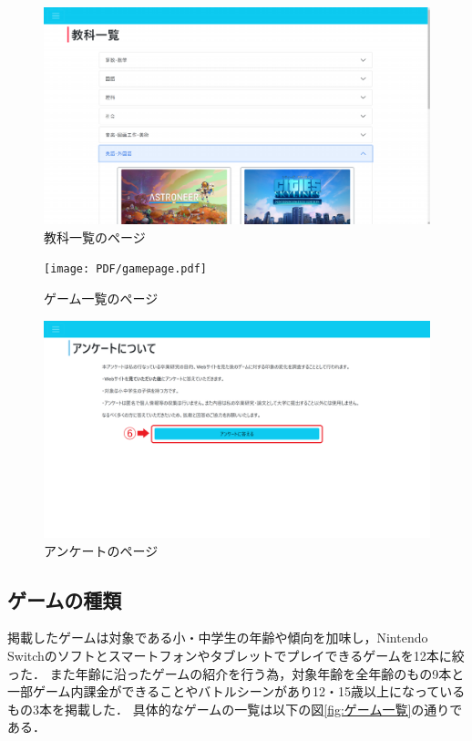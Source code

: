 \documentclass[12pt,a4j,titlepage]{ltjsarticle}
\begin{document}
\begin{figure}[H]
\begin{center}
 \includegraphics[keepaspectratio, scale=0.5]{PDF/subpage.pdf}
\end{center}
 \caption{教科一覧のページ}
 \label{fig:教科ページ}
\end{figure}

\begin{figure}[H]
\begin{center}
 \texttt{[image: PDF/gamepage.pdf]}
\end{center}
 \caption{ゲーム一覧のページ}
 \label{fig:ゲーム一覧ページ}
\end{figure}

\begin{figure}[H]
\begin{center}
 \includegraphics[keepaspectratio, scale=0.15]{PDF/anquepage.pdf}
\end{center}
 \caption{アンケートのページ}
 \label{fig:アンケートページ}
\end{figure}


\subsection{ゲームの種類}
掲載したゲームは対象である小・中学生の年齢や傾向を加味し，Nintendo Switchのソフトとスマートフォンやタブレットでプレイできるゲームを12本に絞った．
また年齢に沿ったゲームの紹介を行う為，対象年齢を全年齢のもの9本と一部ゲーム内課金ができることやバトルシーンがあり12・15歳以上になっているもの3本を掲載した．
具体的なゲームの一覧は以下の図\ref{fig:ゲーム一覧}の通りである．
\end{document}
